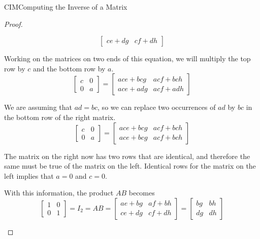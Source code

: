 \begin{subsect}{CIM}{Computing the Inverse of a Matrix}
\begin{proof}
\begin{para}
\begin{equation*}
\begin{bmatrix}
ce+dg & cf+dh
\end{bmatrix}
\end{equation*}
\end{para}
%
\begin{para}Working on the matrices on two ends of this equation, we will multiply the top row by $c$ and the bottom row by $a$.
%
\begin{equation*}
\begin{bmatrix}
c&0\\
0&a
\end{bmatrix}
=
\begin{bmatrix}
ace+bcg & acf+bch\\
ace+adg & acf+adh
\end{bmatrix}
\end{equation*}
\end{para}
%
\begin{para}We are assuming that $ad=bc$, so we can replace two occurrences of $ad$ by $bc$ in the bottom row of the right matrix.
%
\begin{equation*}
\begin{bmatrix}
c&0\\
0&a
\end{bmatrix}
=
\begin{bmatrix}
ace+bcg & acf+bch\\
ace+bcg & acf+bch
\end{bmatrix}
\end{equation*}
\end{para}
%
\begin{para}The matrix on the right now has two rows that are identical, and therefore the same must be true of the matrix on the left.    Identical rows for the matrix on the left implies that $a=0$ and $c=0$.\end{para}
%
\begin{para}With this information, the product $AB$ becomes
%
\begin{equation*}
\begin{bmatrix}
1 & 0\\
0 & 1
\end{bmatrix}
=I_2
=AB
=
\begin{bmatrix}
ae+bg & af+bh\\
ce+dg & cf+dh
\end{bmatrix}
=
\begin{bmatrix}
bg & bh\\
dg & dh
\end{bmatrix}
\end{equation*}
\end{para}

\end{proof}
\end{subsect}
